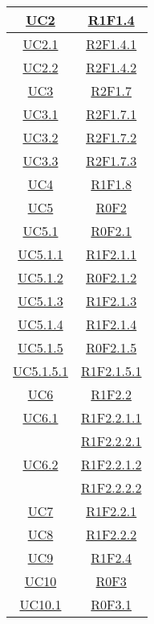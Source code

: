 \begin{longtable}{|c|c|}
\hline
\hyperlink{UC2}{UC2} & \hyperlink{R1F1.4}{R1F1.4}\\
\hline
\hyperlink{UC2.1}{UC2.1} & \hyperlink{R2F1.4.1}{R2F1.4.1}\\
\hline
\hyperlink{UC2.2}{UC2.2} & \hyperlink{R2F1.4.2}{R2F1.4.2}\\
\hline
\hyperlink{UC3}{UC3} & \hyperlink{R2F1.7}{R2F1.7}\\
\hline
\hyperlink{UC3.1}{UC3.1} & \hyperlink{R2F1.7.1}{R2F1.7.1}\\
\hline
\hyperlink{UC3.2}{UC3.2} & \hyperlink{R2F1.7.2}{R2F1.7.2}\\
\hline
\hyperlink{UC3.3}{UC3.3} & \hyperlink{R2F1.7.3}{R2F1.7.3}\\
\hline
\hyperlink{UC4}{UC4} & \hyperlink{R1F1.8}{R1F1.8}\\
\hline
\hyperlink{UC5}{UC5} & \hyperlink{R0F2}{R0F2}\\
\hline
\hyperlink{UC5.1}{UC5.1} & \hyperlink{R0F2.1}{R0F2.1}\\
\hline
\hyperlink{UC5.1.1}{UC5.1.1} & \hyperlink{R1F2.1.1}{R1F2.1.1}\\
\hline
\hyperlink{UC5.1.2}{UC5.1.2} & \hyperlink{R0F2.1.2}{R0F2.1.2}\\
\hline
\hyperlink{UC5.1.3}{UC5.1.3} & \hyperlink{R1F2.1.3}{R1F2.1.3}\\
\hline
\hyperlink{UC5.1.4}{UC5.1.4} & \hyperlink{R1F2.1.4}{R1F2.1.4}\\
\hline
\hyperlink{UC5.1.5}{UC5.1.5} & \hyperlink{R0F2.1.5}{R0F2.1.5}\\
\hline
\hyperlink{UC5.1.5.1}{UC5.1.5.1} & \hyperlink{R1F2.1.5.1}{R1F2.1.5.1}\\
\hline
\hyperlink{UC6}{UC6} & \hyperlink{R1F2.2}{R1F2.2}\\
\hline
\hyperlink{UC6.1}{UC6.1} & \hyperlink{R1F2.2.1.1}{R1F2.2.1.1}\\
& \hyperlink{R1F2.2.2.1}{R1F2.2.2.1}\\
\hline
\hyperlink{UC6.2}{UC6.2} & \hyperlink{R1F2.2.1.2}{R1F2.2.1.2}\\
& \hyperlink{R1F2.2.2.2}{R1F2.2.2.2}\\
\hline
\hyperlink{UC7}{UC7} & \hyperlink{R1F2.2.1}{R1F2.2.1}\\
\hline
\hyperlink{UC8}{UC8} & \hyperlink{R1F2.2.2}{R1F2.2.2}\\
\hline
\hyperlink{UC9}{UC9} & \hyperlink{R1F2.4}{R1F2.4}\\
\hline
\hyperlink{UC10}{UC10} & \hyperlink{R0F3}{R0F3}\\
\hline
\hyperlink{UC10.1}{UC10.1} & \hyperlink{R0F3.1}{R0F3.1}\\

\end{longtable}
